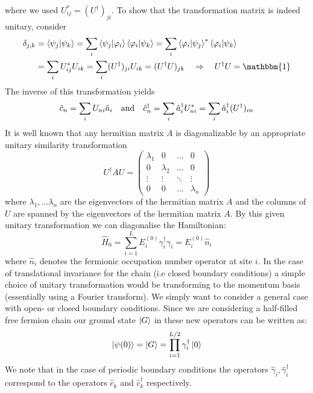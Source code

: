 \documentclass[11pt, a4paper]{article}
\theoremstyle{definition} %
\begin{document}
	 where we used $U_{ij}^* = (U^\dagger)_{ji}$. To show that the transformation matrix is indeed unitary, consider
	 \begin{align}
	 	\delta_{j,k} &= \braket{\psi_j}{\psi_k} = \sum_i \braket{\psi_j}{\varphi_i}\braket{\varphi_i}{\psi_k} = \sum_i \braket{\varphi_i}{\psi_j}^* \braket{\varphi_i}{\psi_k} \\
	 	&= \sum_i U_{ij}^* U_{ik} = \sum_i (U^\dagger)_{ji} U_{ik} = (U^\dagger U)_{jk} \quad \Rightarrow \quad U^\dagger U = \mathbbm{1}
	 \end{align}
	 The inverse of this transformation yields
	 \begin{equation}
	 	\hat{c}_n = \sum_i U_{ni} \hat{a}_i \qq{and} \hat{c}_n^\dagger = \sum_i \hat{a}_i^\dagger U^*_{ni} = \sum_i \hat {a}_i^\dagger (U^\dagger)_{in}
	 \end{equation}
	 It is well known that any hermitian matrix $A$ is diagonalizable by an appropriate unitary similarity transformation
	 \begin{equation}
	 	U^\dagger A U = \begin{pmatrix}
	 		\lambda_1 & 0 &\dots & 0 \\
	 		0 & \lambda_2 & \dots & 0 \\
	 		\vdots & \vdots & \ddots & \vdots \\
	 		0 & 0 & \dots & \lambda_n
	 	\end{pmatrix}
	 \end{equation}
	 where $\lambda_1, \dots \lambda_n$ are the eigenvectors of the hermitian matrix $A$ and the columns of $U$ are spanned by the eigenvectors of the hermitian matrix $A$. By this given unitary transformation we can diagonalise the Hamiltonian:
	 \begin{equation}
	 	\hat{H}_0 = \sum_{i=1}^L E_i^{(0)} \gamma_i^\dagger \gamma_i = E_i^{(0)} \hat{n}_i
	 \end{equation}
	 where $\hat{n}_i$ denotes the fermionic occupation number operator at site $i$. In the case of translational invariance for the chain (i.e closed boundary conditions) a simple choice of unitary transformation would be transforming to the momentum basis (essentially using a Fourier transform). We simply want to consider a general case with open- or closed boundary conditions. Since we are considering a half-filled free fermion chain our ground state $\ket{G}$ in these new operators can be written as:
	 \begin{equation}
	 	\ket{\psi(0)} =\ket{G} = \prod_{i=1}^{L/2} \gamma_i^\dagger \ket{0}
	 \end{equation}
	 We note that in the case of periodic boundary conditions the operators $\hat{\gamma}_i, \hat{\gamma}_i^\dagger$ correspond to the operators $\hat{c}_k$ and $\hat{c}_k^\dagger$ respectively.
	 
\end{document}
